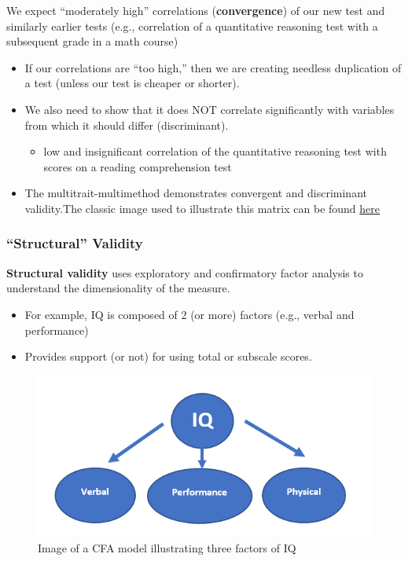 \documentclass[
  english,
]{book}
\providecommand{\tightlist}{%
  \setlength{\itemsep}{0pt}\setlength{\parskip}{0pt}}
\begin{document}
We expect ``moderately high'' correlations (\textbf{convergence}) of our new test and similarly earlier tests (e.g., correlation of a quantitative reasoning test with a subsequent grade in a math course)

\begin{itemize}
\tightlist
\item
  If our correlations are ``too high,'' then we are creating needless duplication of a test (unless our test is cheaper or shorter).
\item
  We also need to show that it does NOT correlate significantly with variables from which it should differ (discriminant).

  \begin{itemize}
  \tightlist
  \item
    low and insignificant correlation of the quantitative reasoning test with scores on a reading comprehension test
  \end{itemize}
\item
  The multitrait-multimethod demonstrates convergent and discriminant validity.The classic image used to illustrate this matrix can be found \href{https://conjointly.com/kb/multitrait-multimethod-matrix/}{here}
  \citep{trochim_multitrait-multimethod_nodate}
\end{itemize}

\hypertarget{structural-validity}{%
\subsubsection{``Structural'' Validity}\label{structural-validity}}

\textbf{Structural validity} uses exploratory and confirmatory factor analysis to understand the dimensionality of the measure.

\begin{itemize}
\tightlist
\item
  For example, IQ is composed of 2 (or more) factors (e.g., verbal and performance)
\item
  Provides support (or not) for using total or subscale scores.
\end{itemize}

\begin{figure}
\centering
\includegraphics{images/PsychoM/CFA.png}
\caption{Image of a CFA model illustrating three factors of IQ}
\end{figure}
\end{document}
